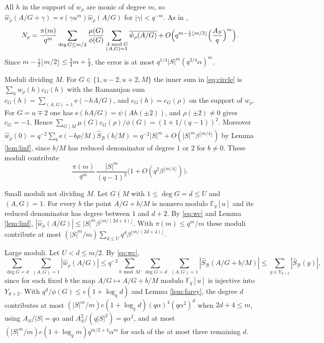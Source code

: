\documentclass[11pt]{amsart}
\theoremstyle{definition}
\newcommand{\F}{\mathbb{F}}
\newcommand{\cB}{\mathcal{B}}
\newcommand{\e}{\mathrm{e}}
\begin{document}
All $h$ in the support of $w_\rho$ are monic of degree $m$, so $\hat w_\rho(A/G+\gamma)=\e(\gamma u^m)\hat w_\rho(A/G)$ for $|\gamma|<q^{-m}$. As in \cite[Section 4]{Porritt},
\begin{equation}\label{eq:circle}
N_\rho=\frac{\pi(m)}{q^m}\sum_{\deg G\le m/2}\frac{\mu(G)}{\phi(G)}\sum_{\substack{A\bmod G\\(A,G)=1}}\overline{\hat w_\rho(A/G)}+O\Bigl(q^{m-\frac12\lfloor m/2\rfloor}\Bigl(\frac{A_S}{q}\Bigr)^m\Bigr).
\end{equation}
Since $m-\frac12\lfloor m/2\rfloor\le\frac34m+\frac14$, the error is at most $q^{1/4}|S|^m(q^{3/4}\alpha)^m$.

Moduli dividing $M$. For $G\in\{1,u-2,u+2,M\}$ the inner sum in \eqref{eq:circle} is $\sum_hw_\rho(h)c_G(h)$ with the Ramanujan sum $c_G(h)=\sum_{(A,G)=1}\e(-hA/G)$, and $c_G(h)=c_G(\rho)$ on the support of $w_\rho$. For $G=u\mp2$ one has $\e(hA/G)=\psi(Ah(\pm2))$, and $\rho(\pm2)\ne0$ gives $c_G=-1$. Hence $\sum_{G\mid M}\mu(G)c_G(\rho)/\phi(G)=(1+1/(q-1))^2$. Moreover $\hat w_\rho(0)=q^{-2}\sum_b\e(-b\rho/M)\hat S_\cB(b/M)=q^{-2}|S|^m+O(|S|^m\beta^{\lfloor m/4\rfloor})$ by Lemma \ref{lem:linf}, since $b/M$ has reduced denominator of degree $1$ or $2$ for $b\ne0$. These moduli contribute
\[
\frac{\pi(m)}{q^m}\,\frac{|S|^m}{(q-1)^2}\bigl(1+O(q^2\beta^{\lfloor m/4\rfloor})\bigr).
\]

Small moduli not dividing $M$. Let $G\nmid M$ with $1\le\deg G=d\le U$ and $(A,G)=1$. For every $b$ the point $A/G+b/M$ is nonzero modulo $\F_q[u]$ and its reduced denominator has degree between $1$ and $d+2$. By \eqref{eq:wc} and Lemma \ref{lem:linf}, $|\hat w_\rho(A/G)|\le|S|^m\beta^{\lfloor m/(2d+4)\rfloor}$. With $\pi(m)\le q^m/m$ these moduli contribute at most $(|S|^m/m)\sum_{d\le U}q^d\beta^{\lfloor m/(2d+4)\rfloor}$.

Large moduli. Let $U<d\le m/2$. By \eqref{eq:wc},
\[
\sum_{\deg G=d}\ \sum_{(A,G)=1}|\hat w_\rho(A/G)|\le q^{-2}\sum_{b\bmod M}\ \sum_{\deg G=d}\ \sum_{(A,G)=1}|\hat S_\cB(A/G+b/M)|\le\sum_{y\in Y_{d+2}}|\hat S_\cB(y)|,
\]
since for each fixed $b$ the map $A/G\mapsto A/G+b/M$ modulo $\F_q[u]$ is injective into $Y_{d+2}$. With $q^d/\phi(G)\le e(1+\log_qd)$ \cite[Lemma 5]{Porritt} and Lemma \ref{lem:farey}, the degree $d$ contributes at most $(|S|^m/m)e(1+\log_qd)(q\alpha)^4(q\alpha^2)^d$ when $2d+4\le m$, using $A_S/|S|=q\alpha$ and $A_S^2/(q|S|^2)=q\alpha^2$, and at most $(|S|^m/m)e(1+\log_qm)q^{m/2+4}\alpha^m$ for each of the at most three remaining $d$.
\end{document}
